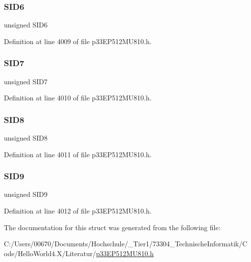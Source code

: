 \subsubsection{\texorpdfstring{S\+I\+D6}{SID6}}
{\footnotesize\ttfamily unsigned S\+I\+D6}



Definition at line 4009 of file p33\+E\+P512\+M\+U810.\+h.

\mbox{\label{structtag_c1_r_x_f5_s_i_d_b_i_t_s_a34097fb76decd431701fa2d86a22328e}} 
\subsubsection{\texorpdfstring{S\+I\+D7}{SID7}}
{\footnotesize\ttfamily unsigned S\+I\+D7}



Definition at line 4010 of file p33\+E\+P512\+M\+U810.\+h.

\mbox{\label{structtag_c1_r_x_f5_s_i_d_b_i_t_s_afe74894633244fdb0b0c01b4e8c522e7}} 
\subsubsection{\texorpdfstring{S\+I\+D8}{SID8}}
{\footnotesize\ttfamily unsigned S\+I\+D8}



Definition at line 4011 of file p33\+E\+P512\+M\+U810.\+h.

\mbox{\label{structtag_c1_r_x_f5_s_i_d_b_i_t_s_a33587704948067005c2a6a3ccc503c99}} 
\subsubsection{\texorpdfstring{S\+I\+D9}{SID9}}
{\footnotesize\ttfamily unsigned S\+I\+D9}



Definition at line 4012 of file p33\+E\+P512\+M\+U810.\+h.



The documentation for this struct was generated from the following file\+:\begin{DoxyCompactItemize}
\item 
C\+:/\+Users/00670/\+Documents/\+Hochschule/\+\_\+\+Tier1/73304\+\_\+\+Technische\+Informatik/\+Code/\+Hello\+World4.\+X/\+Literatur/\hyperlink{p33_e_p512_m_u810_8h}{p33\+E\+P512\+M\+U810.\+h}\end{DoxyCompactItemize}
